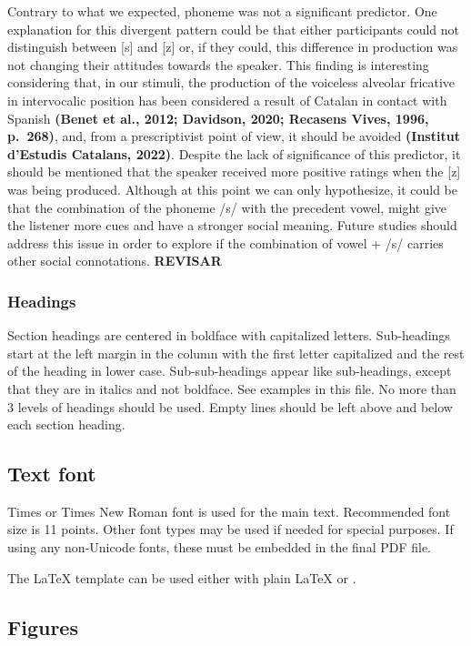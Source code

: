 \documentclass[
  a4paper,
  11pt,
  twocolumn]{article}
\begin{document}
Contrary to what we expected, phoneme was not a significant predictor.
One explanation for this divergent pattern could be that either
participants could not distinguish between {[}s{]} and {[}z{]} or, if
they could, this difference in production was not changing their
attitudes towards the speaker. This finding is interesting considering
that, in our stimuli, the production of the voiceless alveolar fricative
in intervocalic position has been considered a result of Catalan in
contact with Spanish \textbf{(Benet et al., 2012; Davidson, 2020;
Recasens Vives, 1996, p.~268)}, and, from a prescriptivist point of
view, it should be avoided \textbf{(Institut d'Estudis Catalans, 2022)}.
Despite the lack of significance of this predictor, it should be
mentioned that the speaker received more positive ratings when the
{[}z{]} was being produced. Although at this point we can only
hypothesize, it could be that the combination of the phoneme /s/ with
the precedent vowel, might give the listener more cues and have a
stronger social meaning. Future studies should address this issue in
order to explore if the combination of vowel + /s/ carries other social
connotations. \textbf{REVISAR}

\subsubsection{Headings}

Section headings are centered in boldface with capitalized letters.
Sub-headings start at the left margin in the column with the first
letter capitalized and the rest of the heading in lower case.
Sub-sub-headings appear like sub-headings, except that they are in
italics and not boldface. See examples in this file. No more than 3
levels of headings should be used. Empty lines should be left above and
below each section heading.

\subsection{Text font}

Times or Times New Roman font is used for the main text. Recommended
font size is 11 points. Other font types may be used if needed for
special purposes. If using any non-Unicode fonts, these must be embedded
in the final PDF file.

The \LaTeX{} template can be used either with plain \LaTeX{} or
\XeLaTeX.

\subsection{Figures}
\end{document}
